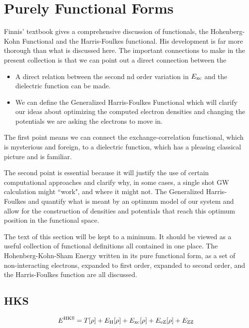 \section{Purely Functional Forms}
Finnis' textbook gives a comprehensive discussion of functionals,
the Hohenberg-Kohn Functional and the Harris-Foulkes functional.
His development is far more thorough than what is discussed here. 
The important connections to make in the present collection
is that we can point out a direct connection between the

\begin{itemize}
\item A direct relation between the second nd order variation in $E_{\rm xc}$ and the dielectric function can be made.
\item We can define the Generalized Harris-Foulkes Functional which will clarify our ideas about optimizing the computed
      electron densities and changing the potentials we are asking the electrons to move in.
\end{itemize}

The first point means we can connect the exchange-correlation functional, 
which is mysterious and foreign, to a dielectric function, which has a pleasing 
classical picture and is familiar.

The second point is essential because it will justify the use of certain 
computational approaches and clarify why, in some cases, a single shot GW
calculation might ``work", and where it might not. The Generalized Harris-Foulkes
and quantify what is meant by an optimum model of our system and allow for the
construction of densities and potentials that reach this optimum position in 
the functional space. 

The text of this section will be kept to a minimum. It should be viewed as a
useful collection of functional definitions all contained in one place. 
The Hohenberg-Kohn-Sham Energy written in its pure functional form,
as a set of non-interacting electrons, expanded to first order, expanded to
second order, and the Harris-Foulkes function are all discussed.

\subsection{HKS}
\begin{equation}
\label{eq:hks}
E^{\rm HKS} = T[\rho] + E_{\rm H}[\rho] + E_{\rm xc}[\rho] + E_{\rm eZ}[\rho] + E_{\rm ZZ}
\end{equation}

